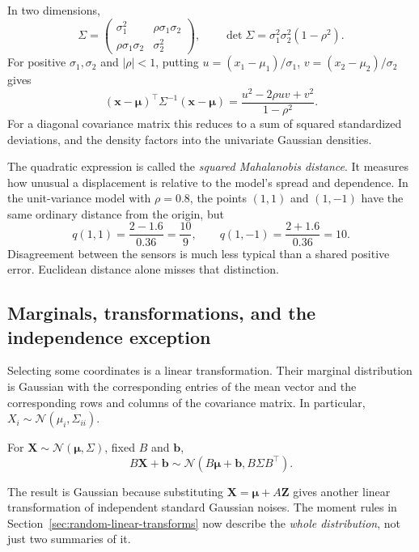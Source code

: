In two dimensions,
\[
  \Sigma=\begin{pmatrix}
    \sigma_1^2&\rho\sigma_1\sigma_2\\
    \rho\sigma_1\sigma_2&\sigma_2^2
  \end{pmatrix},\qquad
  \det\Sigma=\sigma_1^2\sigma_2^2(1-\rho^2).
\]
For positive \(\sigma_1,\sigma_2\) and \(|\rho|<1\), putting
\(u=(x_1-\mu_1)/\sigma_1\), \(v=(x_2-\mu_2)/\sigma_2\) gives
\[
  (\mathbf x-\boldsymbol\mu)^\top\Sigma^{-1}
      (\mathbf x-\boldsymbol\mu)
  =\frac{u^2-2\rho uv+v^2}{1-\rho^2}.
\]
For a diagonal covariance matrix this reduces to a sum of squared
standardized deviations, and the density factors into the univariate
Gaussian densities.

The quadratic expression is called the \emph{squared Mahalanobis
distance}. It measures how unusual a displacement is relative to the
model's spread and dependence. In the unit-variance model with
\(\rho=0.8\), the points \((1,1)\) and \((1,-1)\) have the same
ordinary distance from the origin, but
\[
  q(1,1)=\frac{2-1.6}{0.36}=\frac{10}{9},\qquad
  q(1,-1)=\frac{2+1.6}{0.36}=10.
\]
Disagreement between the sensors is much less typical than a shared
positive error. Euclidean distance alone misses that distinction.

\subsection{Marginals, transformations, and the independence exception}

Selecting some coordinates is a linear transformation. Their marginal
distribution is Gaussian with the corresponding entries of the mean
vector and the corresponding rows and columns of the covariance matrix.
In particular, \(X_i\sim\mathcal N(\mu_i,\Sigma_{ii})\).

\begin{result}
For \(\mathbf X\sim\mathcal N(\boldsymbol\mu,\Sigma)\),
fixed \(B\) and \(\mathbf b\),
\begin{equation}
  B\mathbf X+\mathbf b
  \sim\mathcal N(B\boldsymbol\mu+\mathbf b, B\Sigma B^\top).
  \label{eq:gaussian-vector-transform}
\end{equation}
\end{result}
The result is Gaussian because substituting
\(\mathbf X=\boldsymbol\mu+A\mathbf Z\) gives another linear
transformation of independent standard Gaussian noises. The moment
rules in Section~\ref{sec:random-linear-transforms} now describe the
\emph{whole distribution}, not just two summaries of it.

